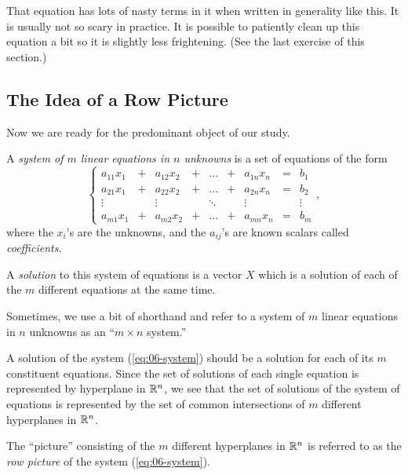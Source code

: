 \documentclass[elementsmain.tex]{subfiles}
\begin{document}
That equation has lots of nasty terms in it when written in generality like this. It is usually not so scary in practice. It is possible to patiently clean up this equation a bit so it is slightly less frightening. (See the last exercise of this section.)


\subsection*{The Idea of a Row Picture}

Now we are ready for the predominant object of our study.


\begin{definition}
A \emph{system of $m$ linear equations in $n$ unknowns} is a set of equations of the form
\begin{equation}\label{eq:06-system}
\left\{
\begin{array}{ccccccccc}
a_{11} x_1 & + & a_{12} x_2 & + & \dots & + & a_{1n} x_n & = & b_1 \\
a_{21} x_1 & + & a_{22} x_2 & + & \dots & + & a_{2n} x_n & = & b_2 \\
\vdots     &   & \vdots     &   & \ddots &  & \vdots     &  & \vdots \\ 
a_{m1} x_1 & + & a_{m2} x_2 & + & \dots & + & a_{mn} x_n & = & b_m 
\end{array}\right.,
\end{equation}
where the $x_i$'s are the unknowns, and the $a_{ij}$'s are known scalars called \emph{coefficients}. 

A \emph{solution} to this system of equations is a vector $X$ which is a solution of each of the $m$ different equations at the same time.
\end{definition}

Sometimes, we use a bit of shorthand and refer to a system of $m$ linear equations in $n$ unknowns as an ``$m\times n$ system.''

\begin{remark} 
A solution of the system (\ref{eq:06-system}) should be a solution for each of its $m$ constituent equations. Since the set of solutions of each single equation is represented by hyperplane in $\mathbb{R}^n$, we see that the set of solutions of the system of equations is represented by the set of common intersections of $m$ different hyperplanes in $\mathbb{R}^n$.

The ``picture'' consisting of the $m$ different hyperplanes in $\mathbb{R}^n$ is referred to as the \emph{row picture} of the system (\ref{eq:06-system}).
\end{remark}
\end{document}
